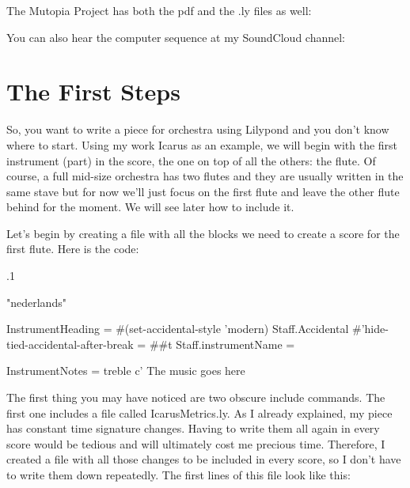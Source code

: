 \documentclass{scrreprt}
\begin{document}
The Mutopia Project has both the pdf and the .ly files as well:

You can also hear the computer sequence at my SoundCloud channel:

\section{The First Steps}

So, you want to write a piece for orchestra using Lilypond and you don't know where to start.
Using my work Icarus as an example, we will begin with the first instrument (part) in the score, the one on top of all the others: the flute.
Of course, a full mid-size orchestra has two flutes and they are usually written in the same stave but for now we'll just focus on the first flute and leave the other flute behind for the moment.
We will see later how to include it.

Let's begin by creating a file with all the blocks we need to create a score for the first flute. Here is the code:

\begin{lilypondcode}
.1 %


\language "nederlands"




InstrumentHeading = {
  #(set-accidental-style 'modern)
  \override Staff.Accidental #'hide-tied-accidental-after-break = ##t
  \set Staff.instrumentName = \markup {}
}

InstrumentNotes = {
  \numericTimeSignature
  \clef treble
  \relative c' {
    The music goes here
  }
}


\paper {
}
\end{lilypondcode}

The first thing you may have noticed are two obscure include commands. 
The first one includes a file called IcarusMetrics.ly. 
As I already explained, my piece has constant time signature changes.
Having to write them all again in every score would be tedious and will ultimately cost me precious time.
Therefore, I created a file with all those changes to be included in every score, so I don't have to write them down repeatedly.
The first lines of this file look like this:
\end{document}
